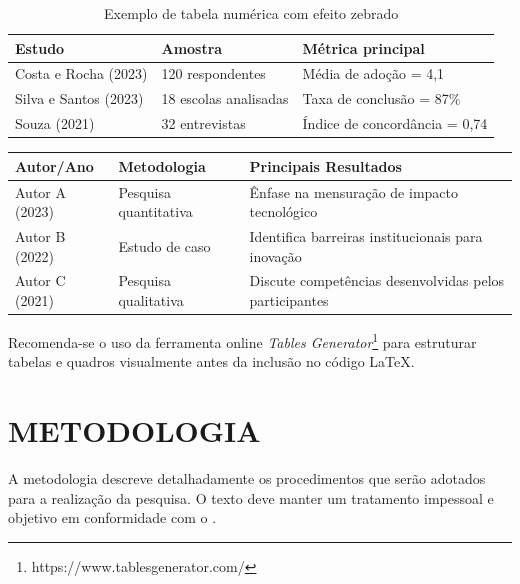 \documentclass[
    12pt,        %
    openany,     %
    oneside,     %
    a4paper,     %
    english,     %
    french,      %
    spanish,     %
    brazil,      %
    article      %
]{abntex2}
\begin{document}
\begin{table}[htbp]
    \centering
    \caption{Exemplo de tabela numérica com efeito zebrado}
    \label{tab:estudos_zebrada}
    \begin{tabularx}{0.8\textwidth}{p{4cm}XX}
        \toprule
        \textbf{Estudo} & \textbf{Amostra} & \textbf{Métrica principal} \\
        \midrule
        Costa e Rocha (2023) & 120 respondentes & Média de adoção = 4,1 \\
        Silva e Santos (2023) & 18 escolas analisadas & Taxa de conclusão = 87\% \\
        Souza (2021) & 32 entrevistas & Índice de concordância = 0,74 \\
        \bottomrule
    \end{tabularx}
\end{table}

\begin{quadro}[htbp]
    \centering
    \caption{Exemplo de quadro qualitativo com efeito zebrado}
    \label{qua:estudos_zebrado}
    \begin{tabularx}{\textwidth}{|p{3cm}|p{4cm}|X|}
        \hline
        \textbf{Autor/Ano} & \textbf{Metodologia} & \textbf{Principais Resultados} \\
        \hline
        Autor A (2023) & Pesquisa quantitativa & Ênfase na mensuração de impacto tecnológico \\ \hline
        Autor B (2022) & Estudo de caso & Identifica barreiras institucionais para inovação \\ \hline
        Autor C (2021) & Pesquisa qualitativa & Discute competências desenvolvidas pelos participantes \\ \hline
    \end{tabularx}
\end{quadro}

Recomenda-se o uso da ferramenta online \textit{Tables Generator}\footnote{https://www.tablesgenerator.com/} para estruturar tabelas e quadros visualmente antes da inclusão no código LaTeX.


\section{METODOLOGIA}
\label{sec:metodologia}

A metodologia descreve detalhadamente os procedimentos que serão adotados para a realização da pesquisa. O texto deve manter um tratamento impessoal e objetivo em conformidade com o .
\end{document}
